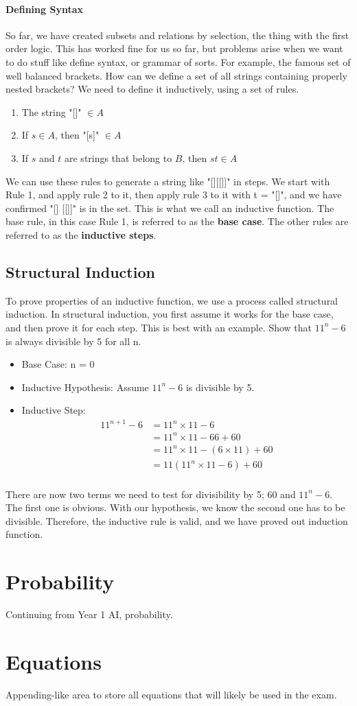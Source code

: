 \paragraph{Defining Syntax} So far, we have created subsets and relations by selection, the thing with the first order logic. This has worked fine for us so far, but problems arise when we want to do stuff like define syntax, or grammar of sorts. For example, the famous set of well balanced brackets. How can we define a set of all strings containing properly nested brackets? We need to define it inductively, using a set of rules.
\begin{enumerate}
	\item The string "[]" $\in A$
	\item If $s \in A$, then "[s]" $\in A$
	\item If $s$ and $t$ are strings that belong to $B$, then $st \in A$
\end{enumerate}
We can use these rules to generate a string like "[][[]]" in steps. We start with Rule 1, and apply rule 2 to it, then apply rule 3 to it with t = "[]", and we have confirmed "[] [[]]" is in the set. This is what we call an inductive function. The base rule, in this case Rule 1, is referred to as the \textbf{base case}. The other rules are referred to as the \textbf{inductive steps}.

\subsection{Structural Induction} To prove properties of an inductive function, we use a process called structural induction. In structural induction, you first assume it works for the base case, and then prove it for each step. This is best with an example. Show that $11^n - 6$ is always divisible by 5 for all n.
\begin{itemize}
	\item Base Case: n = 0
	\item Inductive Hypothesis: Assume $11^n - 6$ is divisible by 5.
	\item Inductive Step: \[ 
	\begin{split}
	11^{n+1} - 6 &= 11^n \times 11 - 6 \\
	&=11^n \times 11 - 66 + 60 \\
	&=11^n \times 11 - (6 \times 11) + 60 \\
	&=11(11^n \times 11 - 6) + 60 \\
	\end{split}\]
\end{itemize}
There are now two terms we need to test for divisibility by 5; $60$ and $11^n - 6$. The first one is obvious. With our hypothesis, we know the second one has to be divisible. Therefore, the inductive rule is valid, and we have proved out induction function.
\section{Probability}
Continuing from Year 1 AI, probability.

\section{Equations}
Appending-like area to store all equations that will likely be used in the exam.
